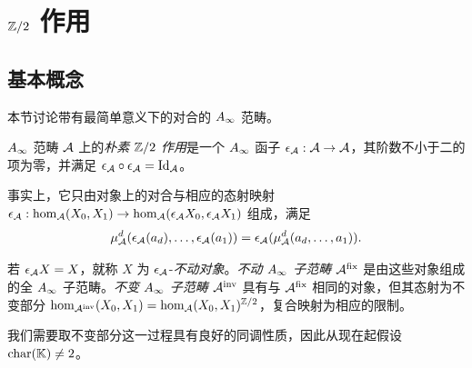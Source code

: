 \section{\texorpdfstring{$\mathbb Z/2$}{Z/2} 作用}\label{sec:6}
\subsection{基本概念}\label{sec:6a}
本节讨论带有最简单意义下的对合的 $A_\infty$ 范畴。
\begin{definition*}
$A_\infty$ 范畴 $\mathcal A$ 上的\emph{朴素 $\mathbb Z/2$ 作用}是一个 $A_\infty$ 函子 $\epsilon_{\mathcal A}:\mathcal A\to\mathcal A$，其阶数不小于二的项为零，并满足 $\epsilon_{\mathcal A}\circ\epsilon_{\mathcal A}=\operatorname{Id}_{\mathcal A}$。
\end{definition*}
事实上，它只由对象上的对合与相应的态射映射 $\epsilon_{\mathcal A}:\hom_{\mathcal A}(X_0,X_1)\to\hom_{\mathcal A}(\epsilon_{\mathcal A}X_0,\epsilon_{\mathcal A}X_1)$ 组成，满足
\[
\mu^d_{\mathcal A}(\epsilon_{\mathcal A}(a_d),\ldots,\epsilon_{\mathcal A}(a_1))=\epsilon_{\mathcal A}(\mu^d_{\mathcal A}(a_d,\ldots,a_1)).
\]
\begin{definition*}
若 $\epsilon_{\mathcal A}X=X$，就称 $X$ 为 $\epsilon_{\mathcal A}$-\emph{不动对象}。\emph{不动 $A_\infty$ 子范畴} $\mathcal A^{\mathrm{fix}}$ 是由这些对象组成的全 $A_\infty$ 子范畴。\emph{不变 $A_\infty$ 子范畴} $\mathcal A^{\mathrm{inv}}$ 具有与 $\mathcal A^{\mathrm{fix}}$ 相同的对象，但其态射为不变部分 $\hom_{\mathcal A^{\mathrm{inv}}}(X_0,X_1)=\hom_{\mathcal A}(X_0,X_1)^{\mathbb Z/2}$，复合映射为相应的限制。
\end{definition*}
我们需要取不变部分这一过程具有良好的同调性质，因此从现在起假设 $\operatorname{char}(\mathbb K)\ne2$。

